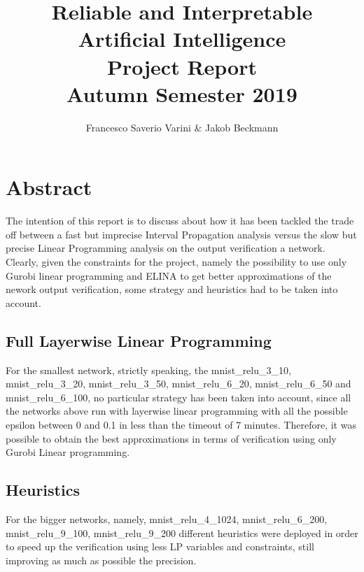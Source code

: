 \documentclass[11pt,a4paper]{article}
\begin{document}
\title{Reliable and Interpretable Artificial Intelligence\\ Project Report\\
 \normalsize{Autumn Semester 2019}}
\author{Francesco Saverio Varini \& Jakob Beckmann}


\maketitle

\thispagestyle{firstpagefooter}


\section{Abstract}

The intention of this report is to discuss about how it has been tackled the trade off between a fast but imprecise Interval Propagation analysis versus the slow but precise Linear Programming analysis on the output verification a network.\\Clearly, given the constraints for the project, namely the possibility to use only Gurobi linear programming and ELINA to  get better approximations of the nework output verification, some strategy and heuristics had to be taken into account.

\subsection{Full Layerwise Linear Programming}

For the smallest network, strictly speaking, the mnist\_relu\_3\_10, mnist\_relu\_3\_20, mnist\_relu\_3\_50, mnist\_relu\_6\_20, mnist\_relu\_6\_50 and mnist\_relu\_6\_100, no particular strategy has been taken into account, since all the networks above run with layerwise linear programming with all the possible epsilon between 0 and 0.1 in less than the timeout of 7 minutes.
Therefore, it was possible to obtain the best approximations in terms of verification using only Gurobi Linear programming.


\subsection{Heuristics}

For the bigger networks, namely, mnist\_relu\_4\_1024, mnist\_relu\_6\_200, mnist\_relu\_9\_100, mnist\_relu\_9\_200 different heuristics were deployed in order to speed up the verification using less LP variables and constraints, still improving as much as possible the precision.
\end{document}
